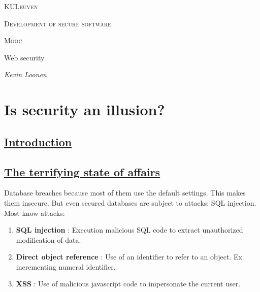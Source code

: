 \documentclass[titlepage]{article}
\begin{document}
    \begin{titlepage}
        \centering
        {\scshape\large KULeuven \par}
        \vspace{0.5cm}
        {\scshape\Large Development of secure software\par}
        \vspace{2cm}
        {\scshape\Large Mooc\par}
        {\Large Web security\par}
        \vspace{10cm}
        {\Large\itshape Kevin Loonen\par}
    \end{titlepage}
    \tableofcontents
    \newpage
    \section{Is security an illusion?}
    \subsection{\href{https://youtu.be/bxlSlDZWftk}{Introduction}}
    \subsection{\href{https://youtu.be/1dfq61DS_-Q}{The terrifying state of affairs}}
    Database breaches because most of them use the default settings. This makes them insecure. But even secured databases are subject to attacks: SQL injection.\\
    Most know attacks:
    \begin{enumerate}
        \item \textbf{SQL injection} : Execution malicious SQL code to extract unauthorized modification of data.
        \item \textbf{Direct object reference} : Use of an identifier to refer to an object. Ex. incrementing numeral identifier.
        \item \textbf{XSS} : Use of malicious javascript code to impersonate the current user.        
    \end{enumerate}
\end{document}
